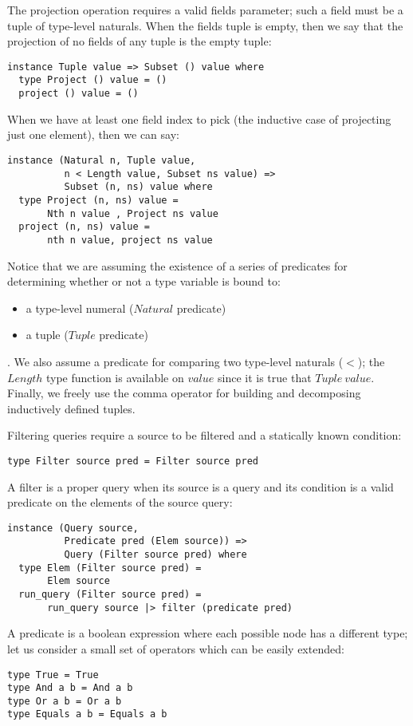 The projection operation requires a valid fields parameter; such a field must be a tuple of type-level naturals. When the fields tuple is empty, then we say that the projection of no fields of any tuple is the empty tuple:
\begin{lstlisting}
instance Tuple value => Subset () value where
  type Project () value = ()
  project () value = ()
\end{lstlisting}

When we have at least one field index to pick (the inductive case of projecting just one element), then we can say:
\begin{lstlisting}
instance (Natural n, Tuple value, 
          n < Length value, Subset ns value) => 
          Subset (n, ns) value where
  type Project (n, ns) value = 
       Nth n value , Project ns value
  project (n, ns) value = 
       nth n value, project ns value
\end{lstlisting}

Notice that we are assuming the existence of a series of predicates for determining whether or not a type variable is bound to:
\begin{itemize}
\item a type-level numeral ($Natural$ predicate)
\item a tuple ($Tuple$ predicate)
\end{itemize}.
We also assume a predicate for comparing two type-level naturals ($<$); the $Length$ type function is available on $value$ since it is true that $Tuple\ value$. Finally, we freely use the comma operator for building and decomposing inductively defined tuples.

Filtering queries require a source to be filtered and a statically known condition:
\begin{lstlisting}
type Filter source pred = Filter source pred
\end{lstlisting}

A filter is a proper query when its source is a query and its condition is a valid predicate on the elements of the source query:
\begin{lstlisting}
instance (Query source, 
          Predicate pred (Elem source)) => 
          Query (Filter source pred) where
  type Elem (Filter source pred) = 
       Elem source
  run_query (Filter source pred) = 
       run_query source |> filter (predicate pred)
\end{lstlisting}

A predicate is a boolean expression where each possible node has a different type; let us consider a small set of operators which can be easily extended:
\begin{lstlisting}
type True = True
type And a b = And a b
type Or a b = Or a b
type Equals a b = Equals a b
\end{lstlisting}

